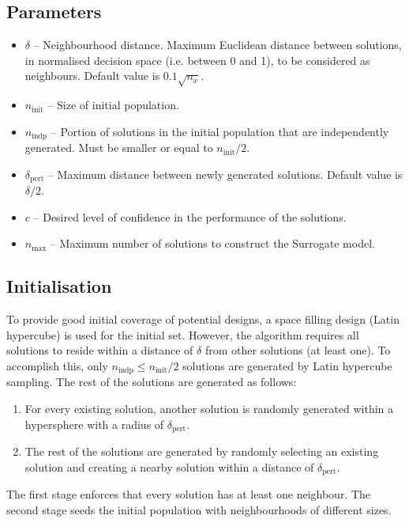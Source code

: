 \documentclass{llncs}
\begin{document}
\subsection{Parameters}\label{subsec:Parameters}
\begin{itemize}
\item $\delta$ -- Neighbourhood distance. Maximum Euclidean distance between solutions, in normalised decision space (i.e. between 0 and 1), to be considered as neighbours. Default value is $0.1 \sqrt{n_x}$.
\item $n_\text{init}$ -- Size of initial population.
\item $n_\text{indp}$ -- Portion of solutions in the initial population that are independently generated. Must be smaller or equal to $n_\text{init}/2$.
\item $\delta_\text{pert}$ -- Maximum distance between newly generated solutions. Default value is $\delta / 2$.
\item $c$ -- Desired level of confidence in the performance of the solutions.
\item $n_\text{max}$ -- Maximum number of solutions to construct the Surrogate model.
\end{itemize}

\subsection{Initialisation}\label{subsec:initialisation}

To provide good initial coverage of potential designs, a space filling design (Latin hypercube) is used for the initial set. However, the algorithm requires all solutions to reside within a distance of $\delta$ from other solutions (at least one).
To accomplish this, only $n_\text{indp} \leq n_\text{init}/2$ solutions are generated by Latin hypercube sampling. The rest of the solutions are generated as follows:
\begin{enumerate}
\item For every existing solution, another solution is randomly generated within a hypersphere with a radius of $\delta_\text{pert}$.
\item The rest of the solutions are generated by randomly selecting an existing solution and creating a nearby solution within a distance of $\delta_\text{pert}$.
\end{enumerate}
The first stage enforces that every solution has at least one neighbour.
The second stage seeds the initial population with neighbourhoods of different sizes.
\end{document}

